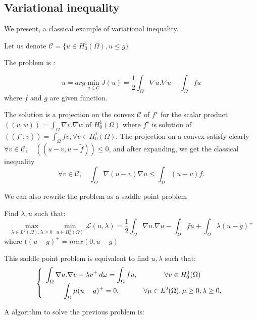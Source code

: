 \documentclass[a4paper,twoside,12pt]{book}
\begin{document}
\subsection{Variational  inequality}
We present, a classical example of variational inequality.

Let us denote  $\mathcal{C} = \{ u\in H^1_0(\Omega), u \le g \}$

The problem is :

$$
 u = arg \min_{u\in \mathcal{C}}  J(u) = \frac{1}{2} \int_\Omega \nabla u . \nabla u - \int_\Omega f u
$$
where $f$ and $g$ are given function.

The solution is a projection on the convex $\mathcal{C}$ of $f^\star$
for the scalar product $((v,w)) = \int_\Omega \nabla v . \nabla w$ of
$  H^1_0(\Omega)$
where $ {f^\star} $ is solution of $ ((f^\star, v )) = \int_\Omega f v, \forall v \in  H^1_0(\Omega)$.
The projection on a convex satisfy clearly
$\forall v \in \mathcal{C}, \quad   (( u -v ,  u - \tilde{f}  )) \leq 0   $,
and after expanding, we get the classical inequality
$$\forall v \in \mathcal{C}, \quad   \int_\Omega \nabla(u -v) \nabla  u  \leq  \int_\Omega   (u-v) f .   $$

We can also rewrite the problem as a saddle point problem

Find $\lambda, u$ such that:
$$
  \max_{\lambda\in L^2(\Omega), \lambda\geq 0}  \min_{u\in H^1_0(\Omega)}  \mathcal{L}(u,\lambda) = \frac{1}{2} \int_\Omega \nabla u . \nabla u - \int_\Omega f u  + \int_{\Omega} \lambda (u-g)^+
$$
where $((u-g)^+ = max(0,u-g) $

This saddle point problem is equivalent to find $ u, \lambda $ such that:
\begin{equation}
 \left\{
\begin{array}{cc}
\displaystyle \int_\Omega \nabla u . \nabla v + \lambda v^+ \,d\omega= \int_\Omega f u  , &\forall v \in H^1_0(\Omega) \cr
\displaystyle \int_\Omega   \mu (u-g)^+ = 0  , & \forall \mu \in L^2(\Omega) , \mu \geq 0, \lambda \geq 0,
 \end{array}\right.\label{eq:iq1}
\end{equation}


A algorithm to solve the previous problem is:
\end{document}
